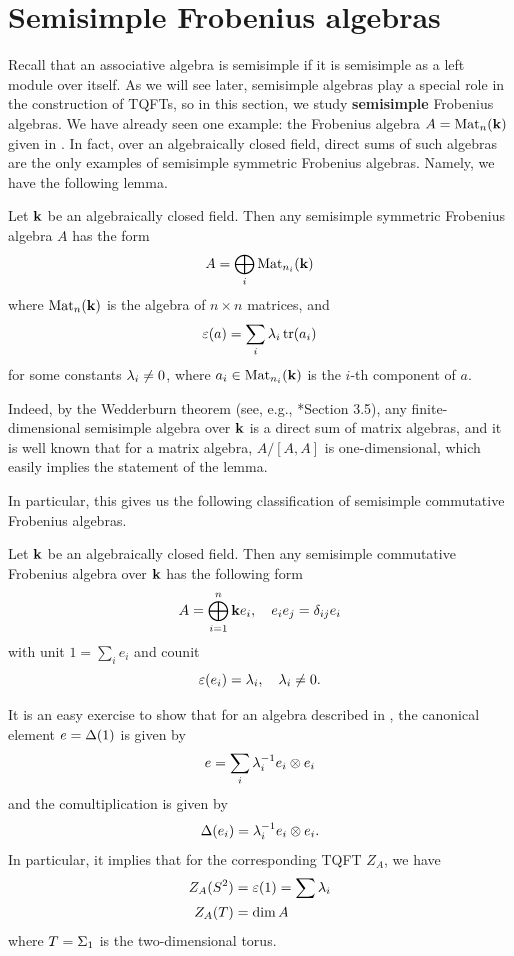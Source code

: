 \section{Semisimple Frobenius algebras}\label{s:frobenius-ss}

Recall that an associative algebra is semisimple if it is semisimple
as a left module over itself. As we will see later, semisimple
algebras play a special role in the
construction of TQFTs, so in this section, we study \textbf{semisimple}
Frobenius algebras. We have already seen one example: the Frobenius algebra
$A=\operatorname{Mat}_n(\mathbf{k})$ given in . In fact, over an algebraically
closed field, direct sums of such algebras are the only examples of semisimple
symmetric Frobenius algebras. Namely, we have the following lemma.

\begin{lemma}\label{l:frobenius-ss}
  Let $\mathbf{k}$ be an algebraically closed field.
  Then any semisimple symmetric Frobenius algebra $A$ has the form
  $$
    A=\bigoplus_i \operatorname{Mat}_{n_i}(\mathbf{k})
  $$
  where $\operatorname{Mat}_n(\mathbf{k})$ is the algebra of $n\times n$ matrices, and
  $$
  \varepsilon(a)=\sum_i \lambda_i \operatorname{tr}(a_i)
  $$
  for some constants $\lambda_i\ne 0$, where $a_i\in\operatorname{Mat}_{n_i}(\mathbf{k})$ is the
  $i$-th component of $a$.
\end{lemma}
Indeed, by the Wedderburn theorem (see, e.g., *{Section 3.5}), any
finite-dimensional semisimple algebra over $\mathbf{k}$ is a direct sum of matrix
algebras, and it is well known that for a matrix algebra, $A/[A,A]$ is
one-dimensional, which easily implies the statement of the lemma.

In particular, this gives us the following classification
of semisimple commutative Frobenius algebras.

\begin{theorem}\label{t:frobenius_commutative}
  Let $\mathbf{k}$ be an algebraically closed field. Then
  any semisimple commutative Frobenius algebra over $\mathbf{k}$ has the following
  form
  $$
  A=\bigoplus_{i=1}^n \mathbf{k} e_i, \quad e_ie_j=\delta_{ij}e_i
  $$
  with unit $1=\sum_i e_i$ and counit
  $$
  \varepsilon(e_i)=\lambda_i, \quad \lambda_i\ne 0.
  $$
\end{theorem}

It is an easy exercise to show that for an algebra described in
, the canonical element $e=\Delta(1)$ is given by
$$
e= \sum_i \lambda_i^{-1}e_i\otimes e_i
$$
and the comultiplication is given by
$$
\Delta(e_i)=\lambda_i^{-1}e_i\otimes e_i.
$$
In particular, it implies that for the corresponding TQFT $Z_A$, we have
\begin{align*}
  Z_A(S^2)&=\varepsilon(1)=\sum \lambda_i\\
  Z_A(T)&=\dim A
\end{align*}
where $T=\Sigma_1$ is the two-dimensional torus.

